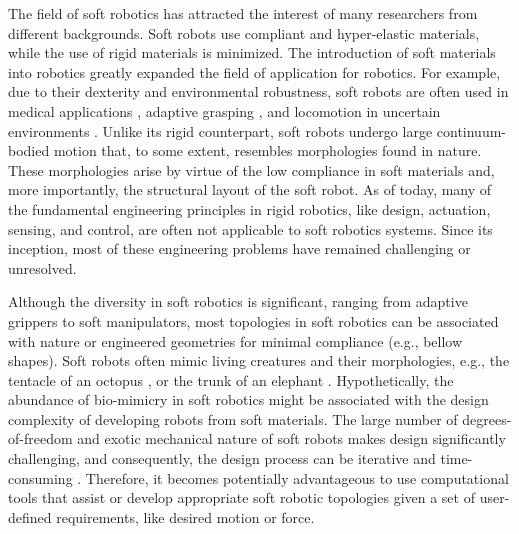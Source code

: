 The field of soft robotics has attracted the interest of many researchers from different backgrounds. Soft robots use compliant and hyper-elastic materials, while the use of rigid materials is minimized. The introduction of soft materials into robotics greatly expanded the field of application for robotics. For example, due to their dexterity and environmental robustness, soft robots are often used in medical applications \cite{Polygerinos2015, Yap2015, Asbeck2015Nov}, adaptive grasping \cite{Galloway2016, Hughes2016}, and locomotion in uncertain environments \cite{Drotman2017}. Unlike its rigid counterpart, soft robots undergo large continuum-bodied motion that, to some extent, resembles morphologies found in nature. These morphologies arise by virtue of the low compliance in soft materials and, more importantly, the structural layout of the soft robot. As of today, many of the fundamental engineering principles in rigid robotics, like design, actuation, sensing, and control, are often not applicable to soft robotics systems. Since its inception, most of these engineering problems have remained challenging or unresolved.

Although the diversity in soft robotics is significant, ranging from adaptive grippers to soft manipulators, most topologies in soft robotics can be associated with nature or engineered geometries for minimal compliance (e.g., bellow shapes). Soft robots often mimic living creatures and their morphologies, e.g., the tentacle of an octopus \cite{Galloway2016, Wehner2016}, or the trunk of an elephant \cite{Drotman2017}. Hypothetically, the abundance of bio-mimicry in soft robotics might be associated with the design complexity of developing robots from soft materials. The large number of degrees-of-freedom and exotic mechanical nature of soft robots makes design significantly challenging, and consequently, the design process can be iterative and time-consuming \cite{Wehner2016}. Therefore, it becomes potentially advantageous to use computational tools that assist or develop appropriate soft robotic topologies given a set of user-defined requirements, like desired motion or force.

